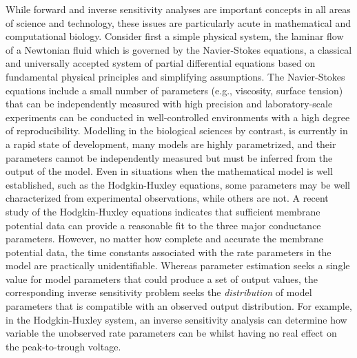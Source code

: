 \documentclass[10pt,letterpaper]{article}
\begin{document}
While forward and inverse sensitivity analyses are important concepts in all areas of science and technology, these issues are particularly acute in mathematical and computational biology. Consider first a simple physical system, the laminar flow of a Newtonian fluid which is governed by the Navier-Stokes equations, a classical and universally accepted system of partial differential equations based on fundamental physical principles and simplifying assumptions. The Navier-Stokes equations include a small number of parameters (e.g., viscosity, surface tension) that can be independently measured with high precision and laboratory-scale experiments can be conducted in well-controlled environments with a high degree of reproducibility. Modelling in the biological sciences by contrast, is currently in a rapid state of development, many models are highly parametrized, and their parameters cannot be independently measured but must be inferred from the output of the model. Even in situations when the mathematical model is well established, such as the Hodgkin-Huxley equations, some parameters may be well characterized from experimental observations, while others are not. A recent study of the Hodgkin-Huxley equations \cite{DGHC-2018} indicates that sufficient membrane potential data can provide a reasonable fit to the three major conductance parameters. However, no matter how complete and accurate the membrane potential data, the time constants associated with the rate parameters in the model are practically unidentifiable.  Whereas parameter estimation seeks a single value for model parameters that could produce a set of output values, the corresponding inverse sensitivity problem seeks the \emph{distribution} of model parameters that is compatible with an observed output distribution. For example, in the Hodgkin-Huxley system, an inverse sensitivity analysis can determine how variable the unobserved rate parameters can be whilst having no real effect on the peak-to-trough voltage.
\end{document}
